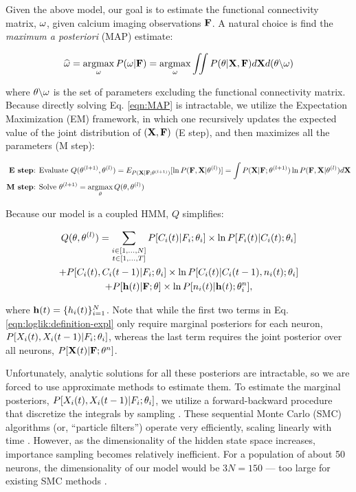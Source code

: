 Given the above model, our goal is to estimate the functional connectivity matrix, $\mathbf{\omega}$, given calcium imaging observations ${\bf F}$. A natural choice is find the \emph{maximum a posteriori} (MAP) estimate:

\begin{equation}\label{eqn:MAP}
\widehat{\mathbf{\omega}}=\operatorname*{argmax}_{\mathbf{\omega}} P(\mathbf{\omega}| {\bf F}) = \operatorname*{argmax}_{\mathbf{\omega}} \iint P(\mathbf{\theta}| {\bf X}, {\bf F}) d{\bf X} d(\mathbf{\theta} \backslash \mathbf{\omega})
\end{equation}

\noindent where $\mathbf{\theta} \backslash \mathbf{\omega}$ is the set of parameters excluding the functional connectivity matrix.  Because directly solving Eq. \eqref{eqn:MAP} is intractable, we utilize the Expectation Maximization (EM) framework, in which one recursively updates the expected value of the joint distribution of $({\bf X}, {\bf F})$ (E step), and then maximizes all the parameters (M step):

\begin{align*}
\textbf{E step} &\text{: Evaluate } Q(\mathbf{\theta}^{(l+1)},\mathbf{\theta}^{(l)}) = E_{P({\bf X} | {\bf F}; \mathbf{\theta}^{(l+1)})}[ \ln P({\bf F}, {\bf X} | \mathbf{\theta}^{(l)})] = \int P({\bf X} | {\bf F}; \mathbf{\theta}^{(l+1)}) \ln P({\bf F}, {\bf X} | \mathbf{\theta}^{(l)}) d {\bf X}  \\
\textbf{M step} &\text{: Solve } \mathbf{\theta}^{(l+1)} = \operatorname*{argmax}_{\mathbf{\theta}} Q(\mathbf{\theta},\mathbf{\theta}^{(l)})  
\end{align*}

Because our model is a coupled HMM, $Q$ simplifies:

\begin{multline}\label{eqn:loglik:definition-expl}
Q(\mathbf{\theta},\mathbf{\theta}^{(l)}) = 
\sum_{\substack{i \in [1,\ldots,N] \\ t \in [1,\ldots, T]}} 
P[C_i(t) | F_i; \mathbf{\theta}_i] \times \ln P[F_i(t)|C_i(t); \mathbf{\theta}_i] 
\\ + P[C_i(t), C_i(t-1) | F_i; \mathbf{\theta}_i] \times \ln P[C_i(t)|C_i(t-1), n_i(t); \mathbf{\theta}_i] 
\\ + P[\mathbf{h}(t) | {\bf F}; \mathbf{\theta}] \times \ln P[n_i(t)| \mathbf{h}(t); \mathbf{\theta}^n_i],
\end{multline}

\noindent where $\mathbf{h}(t)=\{h_i(t)\}_{i=1}^N$.  Note that while the first two terms in Eq. \eqref{eqn:loglik:definition-expl} only require marginal posteriors for each neuron, $P[X_i(t), X_i(t-1) | F_i; \mathbf{\theta}_i]$, whereas the last term requires the joint posterior over all neurons, $P[{\bf X}(t) | {\bf F}; \mathbf{\theta}^n]$.  

Unfortunately, analytic solutions for all these posteriors are intractable, so we are forced to use approximate methods to estimate them.  To estimate the marginal posteriors, $P[X_i(t), X_i(t-1) | F_i; \mathbf{\theta}_i]$, we utilize a forward-backward procedure that discretize the integrals by sampling \cite{DFG01, MINKAPHD, Fearnhead2003, koyama08, Andrieu2007, NBR03}.  These sequential Monte Carlo (SMC) algorithms (or, ``particle filters'') operate very efficiently, scaling linearly with time \cite{RAB89}. However, as the dimensionality of the hidden state space increases, importance sampling becomes relatively inefficient.  For a population of about 50 neurons, the dimensionality of our model would be $3N=150$ --- too large for existing SMC methods \cite{??}.  

